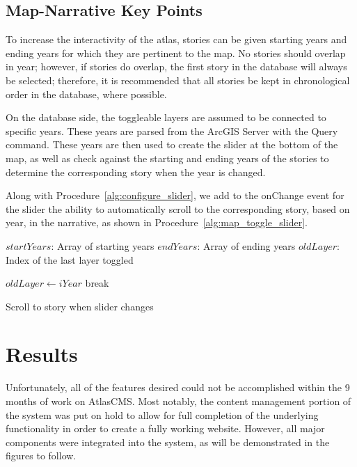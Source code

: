 \documentclass[11pt, final, conference, twocolumn]{IEEEtran}
\begin{document}
\subsection{Map-Narrative Key Points}
\label{sec:map_narrative_key_points}
To increase the interactivity of the atlas, stories can be given starting years and ending years for which they are pertinent to the map. No stories should overlap in year; however, if stories do overlap, the first story in the database will always be selected; therefore, it is recommended that all stories be kept in chronological order in the database, where possible.

On the database side, the toggleable layers are assumed to be connected to specific years. These years are parsed from the ArcGIS Server with the Query command. These years are then used to create the slider at the bottom of the map, as well as check against the starting and ending years of the stories to determine the corresponding story when the year is changed.

Along with Procedure~\ref{alg:configure_slider}, we add to the onChange event for the slider the ability to automatically scroll to the corresponding story, based on year, in the narrative, as shown in Procedure~\ref{alg:map_toggle_slider}.

\begin{algorithm}
	\begin{algorithmic}
		\Require $startYears$: Array of starting years
		\Require $endYears$: Array of ending years
		\Require $oldLayer$: Index of the last layer toggled
		
					\State $oldLayer\gets iYear$
					\State {}
					\State \Return break
				\EndIf
			\EndIf
		\EndFor
	\end{algorithmic}
	\caption{Scroll to story when slider changes}
	\label{alg:map_toggle_slider}
\end{algorithm}

\section{Results}
Unfortunately, all of the features desired could not be accomplished within the 9 months of work on AtlasCMS. Most notably, the content management portion of the system was put on hold to allow for full completion of the underlying functionality in order to create a fully working website. However, all major components were integrated into the system, as will be demonstrated in the figures to follow.
\end{document}
